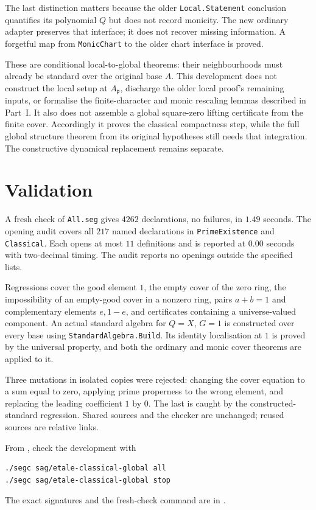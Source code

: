 \documentclass[11pt]{article}
\begin{document}
The last distinction matters because the older \texttt{Local.Statement}
conclusion quantifies its polynomial $Q$ but does not record monicity.
The new ordinary adapter preserves that interface; it does not recover
missing information. A forgetful map from \texttt{MonicChart} to the
older chart interface is proved.

These are conditional local-to-global theorems: their neighbourhoods
must already be standard over the original base $A$. This development
does not construct the local setup at $A_{\mathfrak p}$, discharge the
older local proof's remaining inputs, or formalise the finite-character
and monic rescaling lemmas described in Part~I. It also does not assemble
a global square-zero lifting certificate from the finite cover.
Accordingly it proves the classical compactness step, while the full
global structure theorem from its original hypotheses still needs that
integration. The constructive dynamical replacement remains separate.

\section{Validation}

A fresh check of \texttt{All.seg} gives $4262$ declarations, no failures,
in $1.49$ seconds. The opening audit covers all $217$ named declarations
in \texttt{PrimeExistence} and \texttt{Classical}. Each opens at most
$11$ definitions and is reported at $0.00$ seconds with two-decimal
timing. The audit reports no openings outside the specified lists.

Regressions cover the good element $1$, the empty cover of the zero ring,
the impossibility of an empty-good cover in a nonzero ring, pairs
$a+b=1$ and complementary elements $e,1-e$, and certificates containing
a universe-valued component. An actual standard algebra for $Q=X$,
$G=1$ is constructed over every base using \texttt{StandardAlgebra.Build}.
Its identity localisation at $1$ is proved by the universal property,
and both the ordinary and monic cover theorems are applied to it.

Three mutations in isolated copies were rejected: changing the cover
equation to a sum equal to zero, applying prime properness to the wrong
element, and replacing the leading coefficient $1$ by $0$. The last is
caught by the constructed-standard regression. Shared sources and the
checker are unchanged; reused sources are relative links.

From , check the development with
\begin{verbatim}
./segc sag/etale-classical-global all
./segc sag/etale-classical-global stop
\end{verbatim}
The exact signatures and the fresh-check command are in
.
\end{document}
